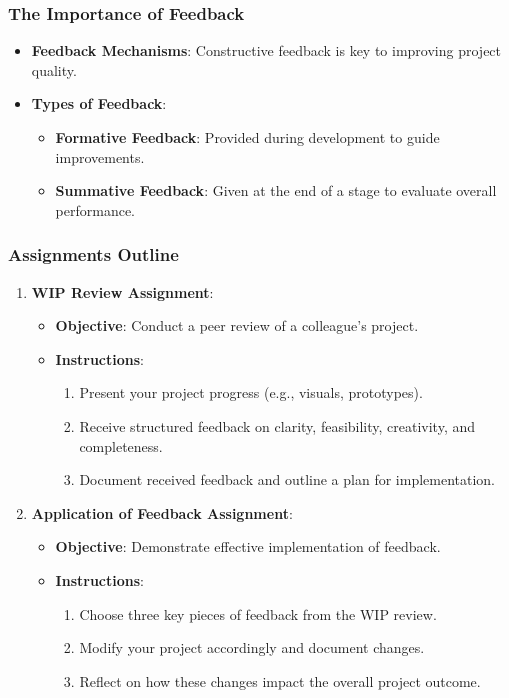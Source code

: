 \documentclass[aspectratio=169]{beamer}
\begin{document}
\begin{frame}[fragile]
    \frametitle{The Importance of Feedback}
    \begin{itemize}
        \item \textbf{Feedback Mechanisms}: Constructive feedback is key to improving project quality.
        \item \textbf{Types of Feedback}:
            \begin{itemize}
                \item \textbf{Formative Feedback}: Provided during development to guide improvements.
                \item \textbf{Summative Feedback}: Given at the end of a stage to evaluate overall performance.
            \end{itemize}
    \end{itemize}
\end{frame}

\begin{frame}[fragile]
    \frametitle{Assignments Outline}
    \begin{enumerate}
        \item \textbf{WIP Review Assignment}:
            \begin{itemize}
                \item \textbf{Objective}: Conduct a peer review of a colleague’s project.
                \item \textbf{Instructions}:
                    \begin{enumerate}
                        \item Present your project progress (e.g., visuals, prototypes).
                        \item Receive structured feedback on clarity, feasibility, creativity, and completeness.
                        \item Document received feedback and outline a plan for implementation.
                    \end{enumerate}
            \end{itemize}

        \item \textbf{Application of Feedback Assignment}:
            \begin{itemize}
                \item \textbf{Objective}: Demonstrate effective implementation of feedback.
                \item \textbf{Instructions}:
                    \begin{enumerate}
                        \item Choose three key pieces of feedback from the WIP review.
                        \item Modify your project accordingly and document changes.
                        \item Reflect on how these changes impact the overall project outcome.
                    \end{enumerate}
            \end{itemize}
    \end{enumerate}
\end{frame}
\end{document}
